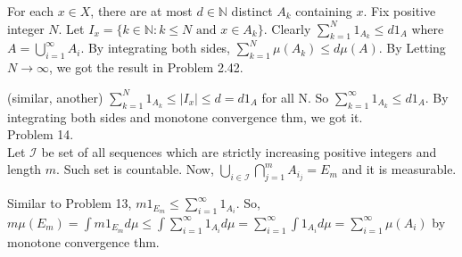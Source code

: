 For each $x \in X$, there are at most $d\in \mathbb{N}$ distinct $A_k$ containing $x$.
Fix positive integer $N$. Let $I_x = \{ k \in \mathbb{N} : k \leq N \text{ and } x\in A_k\}$.
Clearly $\sum_{k=1}^N 1_{A_k} \leq d 1_A$ where $A = \bigcup_{i=1}^{\infty}A_i$.
By integrating both sides, $\sum_{k=1}^N \mu(A_k) \leq d \mu(A)$.
By Letting $N \rightarrow \infty$, we got the result in Problem 2.42.

(similar, another) $\sum_{k=1}^N 1_{A_k} \leq \left | I_x \right | \leq d = d 1_A$ for all N.
So $\sum_{k=1}^{\infty} 1_{A_k} \leq d1_A$.
By integrating both sides and monotone convergence thm, we got it.\\

Problem 14. \\

Let $\mathcal{I}$ be set of all sequences which are strictly increasing positive integers and length $m$.
Such set is countable. Now, $\bigcup_{i \in \mathcal{I}} \bigcap_{j=1}^m A_{i_j} = E_m$ and it is measurable.

Similar to Problem 13, $m 1_{E_m} \leq \sum_{i=1}^{\infty}1_{A_i}$.
So, $m \mu(E_m) = \int m 1_{E_m} d\mu \leq \int \sum_{i=1}^{\infty}1_{A_i} d\mu = \sum_{i=1}^{\infty} \int 1_{A_i} d\mu = \sum_{i=1}^{\infty}\mu(A_i)$ by monotone convergence thm.
